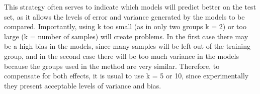This strategy often serves to indicate which models will predict better on the test set, as it allows the levels of error and variance generated by the models to be compared. Importantly, using k too small (as in only two groups k = 2) or too large (k = number of samples) will create problems. In the first case there may be a high bias in the models, since many samples will be left out of the training group, and in the second case there will be too much variance in the models because the groups used in the method are very similar. Therefore, to compensate for both effects, it is usual to use k = 5 or 10, since experimentally they present acceptable levels of variance and bias.

